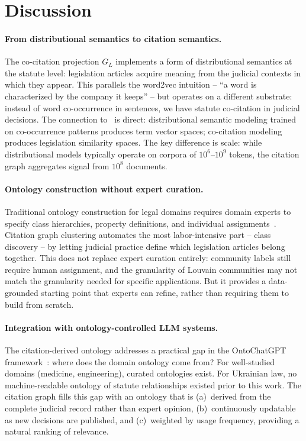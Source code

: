 \documentclass[11pt]{article}
\begin{document}
\section{Discussion}
\label{sec:discussion}

\paragraph{From distributional semantics to citation semantics.}
The co-citation projection $G_L$ implements a form of distributional semantics at the statute level: legislation articles acquire meaning from the judicial contexts in which they appear.
This parallels the word2vec intuition -- ``a word is characterized by the company it keeps'' -- but operates on a different substrate: instead of word co-occurrence in sentences, we have statute co-citation in judicial decisions.
The connection to~\citet{palagin2020distributional} is direct: distributional semantic modeling trained on co-occurrence patterns produces term vector spaces; co-citation modeling produces legislation similarity spaces.
The key difference is scale: while distributional models typically operate on corpora of $10^6$--$10^9$ tokens, the citation graph aggregates signal from $10^8$ documents.

\paragraph{Ontology construction without expert curation.}
Traditional ontology construction for legal domains requires domain experts to specify class hierarchies, property definitions, and individual assignments~\citep{gruber1993ontology}.
Citation graph clustering automates the most labor-intensive part -- class discovery -- by letting judicial practice define which legislation articles belong together.
This does not replace expert curation entirely: community labels still require human assignment, and the granularity of Louvain communities may not match the granularity needed for specific applications.
But it provides a data-grounded starting point that experts can refine, rather than requiring them to build from scratch.

\paragraph{Integration with ontology-controlled LLM systems.}
The citation-derived ontology addresses a practical gap in the OntoChatGPT framework~\citep{palagin2023ontochatgpt}: where does the domain ontology come from?
For well-studied domains (medicine, engineering), curated ontologies exist.
For Ukrainian law, no machine-readable ontology of statute relationships existed prior to this work.
The citation graph fills this gap with an ontology that is (a)~derived from the complete judicial record rather than expert opinion, (b)~continuously updatable as new decisions are published, and (c)~weighted by usage frequency, providing a natural ranking of relevance.
\end{document}
